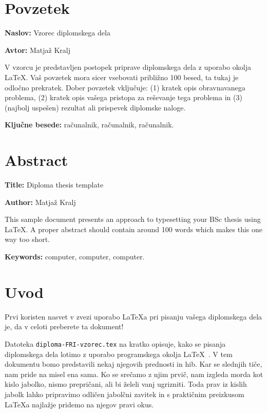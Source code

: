 \documentclass[a4paper,12pt,openright]{book}
\newcommand{\ttitle}{Vzorec diplomskega dela}
\newcommand{\ttitleEn}{Diploma thesis template}
\newcommand{\tauthor}{Matjaž Kralj}
\newcommand{\tkeywords}{računalnik, računalnik, računalnik}
\newcommand{\tkeywordsEn}{computer, computer, computer}
\newcommand{\clearemptydoublepage}{\newpage{\pagestyle{empty}\cleardoublepage}}
\begin{document}
\clearemptydoublepage

\chapter*{Povzetek}

\noindent\textbf{Naslov:} \ttitle
\bigskip

\noindent\textbf{Avtor:} \tauthor
\bigskip

\noindent V vzorcu je predstavljen postopek priprave diplomskega dela z uporabo okolja \LaTeX. Vaš povzetek mora sicer vsebovati približno 100 besed, ta tukaj je odločno prekratek.
Dober povzetek vključuje: (1) kratek opis obravnavanega problema, (2) kratek opis vašega pristopa za reševanje tega problema in (3) (najbolj uspešen) rezultat ali prispevek diplomske naloge.

\bigskip

\noindent\textbf{Ključne besede:} \tkeywords.
\clearemptydoublepage

\chapter*{Abstract}

\noindent\textbf{Title:} \ttitleEn
\bigskip

\noindent\textbf{Author:} \tauthor
\bigskip

\noindent This sample document presents an approach to typesetting your BSc thesis using \LaTeX.
A proper abstract should contain around 100 words which makes this one way too short.
\bigskip

\noindent\textbf{Keywords:} \tkeywordsEn.
\clearemptydoublepage

\mainmatter
\setcounter{page}{1}
\pagestyle{fancy}

\chapter{Uvod}
Prvi koristen nasvet v zvezi uporabo \LaTeX{a} pri pisanju vašega diplomskega dela je, da v celoti preberete ta dokument!

Datoteka {\tt diploma-FRI-vzorec.tex} na kratko opisuje, kako se pisanja diplomskega dela lotimo z uporabo programskega okolja \LaTeX~\cite{lamport,nenajkrajsi}.
V tem dokumentu bomo predstavili nekaj njegovih prednosti in hib.
Kar se slednjih tiče, nam pride na misel ena sama.
Ko se srečamo z njim prvič, nam izgleda morda kot kislo jabolko, nismo prepričani, ali bi želeli vanj ugrizniti.
Toda prav iz kislih jabolk lahko pripravimo odličen jabolčni zavitek in s praktičnim preizkusom \LaTeX a najlažje pridemo na njegov pravi okus.
\end{document}
